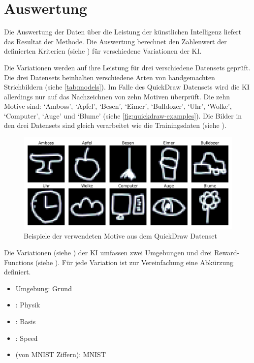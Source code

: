  
\section{Auswertung}\label{chap:m_auswert}
Die Auswertung der Daten über die Leistung der künstlichen Intelligenz liefert
das Resultat der Methode. Die Auswertung berechnet den Zahlenwert der
definierten Kriterien (siehe ) für verschiedene Variationen
der KI.
 
Die Variationen werden auf ihre Leistung für drei verschiedene Datensets
geprüft. Die drei Datensets beinhalten verschiedene Arten von handgemachten
Strichbildern (siehe \autoref{tab:models}). Im Falle des QuickDraw Datensets
wird die KI allerdings nur auf das Nachzeichnen von zehn Motiven überprüft. Die
zehn Motive sind: `Amboss', `Apfel', `Besen', `Eimer', `Bulldozer', `Uhr',
`Wolke', `Computer', `Auge' und `Blume' (siehe
\autoref{fig:quickdraw-examples}). Die Bilder in den drei Datensets sind gleich
verarbeitet wie die Trainingsdaten (siehe ).
 
\begin{figure}[!ht]
 \centering
 \includegraphics[width=\textwidth]{images/methode/quickdraw-examples.png}
 \caption{Beispiele der verwendeten Motive aus dem QuickDraw Datenset}\label{fig:quickdraw-examples}
\end{figure}
 
 
Die Variationen (siehe ) der KI umfassen zwei Umgebungen und
drei Reward-Functions (siehe ). Für jede Variation ist zur
Vereinfachung eine Abkürzung definiert.
\begin{itemize}
 \item {} Umgebung: Grund
 \item {}: Physik
 \item {}: Basis
 \item {}: Speed
 \item {} (von MNIST Ziffern): MNIST
\end{itemize}
 

